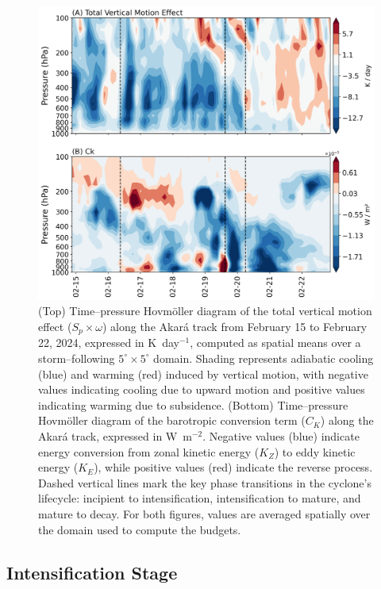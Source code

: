 \documentclass[pdflatex,sn-chicago]{sn-jnl}%
\theoremstyle{plain}
\theoremstyle{definition}
\theoremstyle{remark}
\theoremstyle{definition}
\begin{document}
\begin{figure}[h!]
\centering
\includegraphics[width=\textwidth]{SigmaOmega_Ck_combined_hov.png}
\caption{(Top) Time–pressure Hovmöller diagram of the total vertical motion effect ($S_p \times \omega$) along the Akará track from February 15 to February 22, 2024, expressed in K~day$^{-1}$, computed as spatial means over a storm–following $5^\circ\times5^\circ$ domain. Shading represents adiabatic cooling (blue) and warming (red) induced by vertical motion, with negative values indicating cooling due to upward motion and positive values indicating warming due to subsidence. (Bottom) Time–pressure Hovmöller diagram of the barotropic conversion term ($C_K$) along the Akará track, expressed in W~m$^{-2}$. Negative values (blue) indicate energy conversion from zonal kinetic energy ($K_Z$) to eddy kinetic energy ($K_E$), while positive values (red) indicate the reverse process. Dashed vertical lines mark the key phase transitions in the cyclone's lifecycle: incipient to intensification, intensification to mature, and mature to decay. For both figures, values are averaged spatially over the domain used to compute the budgets.}
\label{fig:SigmaOmega_Ck_combined_hov}
\end{figure}


\subsection{Intensification Stage}
\end{document}

